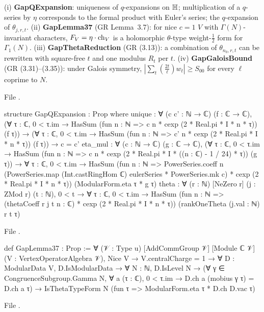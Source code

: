 \begin{definition}\label{l22:def:gaps}
(i) \textbf{GapQExpansion}: uniqueness of $q$-expansions on $\mathbb{H}$; multiplication of a $q$-series by $\eta$
corresponds to the formal product with Euler's series; the $q$-expansion of $\theta_{j,r,t}$.
(ii) \textbf{GapLemma37} (GR Lemma~3.7): for nice $c=1$ $V$ with $\Gamma(N)$-invariant characters,
$F_V=\eta\cdot\operatorname{ch}_V$ is a holomorphic $\theta$-type weight-$\frac12$ form for $\Gamma_1(N)$.
(iii) \textbf{GapThetaReduction} (GR (3.13)): a combination of $\theta_{n_0,r,t}$ can be rewritten with square-free
$t$ and one modulus $R_t$ per $t$.
(iv) \textbf{GapGaloisBound} (GR (3.31)--(3.35)): under Galois symmetry,
$|\sum_t(\tfrac{2t}{\ell})w_t|\ge S_{00}$ for every $\ell$ coprime to $N$.
\end{definition}
\noindent File .
\begin{leancode}
structure GapQExpansion : Prop where
  unique : ∀ (c c' : ℕ → ℂ) (f : ℂ → ℂ),
    (∀ τ : ℂ, 0 < τ.im → HasSum (fun n : ℕ => c n * cexp (2 * Real.pi * I * n * τ)) (f τ)) →
    (∀ τ : ℂ, 0 < τ.im → HasSum (fun n : ℕ => c' n * cexp (2 * Real.pi * I * n * τ)) (f τ)) →
    c = c'
  eta_mul : ∀ (c : ℕ → ℂ) (g : ℂ → ℂ),
    (∀ τ : ℂ, 0 < τ.im →
      HasSum (fun n : ℕ => c n * cexp (2 * Real.pi * I * ((n : ℂ) - 1 / 24) * τ)) (g τ)) →
    ∀ τ : ℂ, 0 < τ.im →
      HasSum (fun n : ℕ => PowerSeries.coeff n
        (PowerSeries.map (Int.castRingHom ℂ) eulerSeries * PowerSeries.mk c) *
          cexp (2 * Real.pi * I * n * τ)) (ModularForm.eta τ * g τ)
  theta : ∀ (r : ℕ) [NeZero r] (j : ZMod r) (t : ℕ), 0 < t → ∀ τ : ℂ, 0 < τ.im →
    HasSum (fun n : ℕ => (thetaCoeff r j t n : ℂ) * cexp (2 * Real.pi * I * n * τ))
      (rankOneTheta (j.val : ℕ) r t τ)
\end{leancode}
\noindent File .
\begin{leancode}
def GapLemma37 : Prop :=
  ∀ (𝒱 : Type u) [AddCommGroup 𝒱] [Module ℂ 𝒱] (V : VertexOperatorAlgebra 𝒱), Nice V →
    V.centralCharge = 1 → ∀ D : ModularData V, D.IsModularData → ∀ N : ℕ, D.IsLevel N →
      (∀ γ ∈ CongruenceSubgroup.Gamma N, ∀ a (τ : ℂ), 0 < τ.im →
        D.ch a (mobius γ τ) = D.ch a τ) →
      IsThetaTypeForm N (fun τ => ModularForm.eta τ * D.ch D.vac τ)
\end{leancode}
\noindent File .
